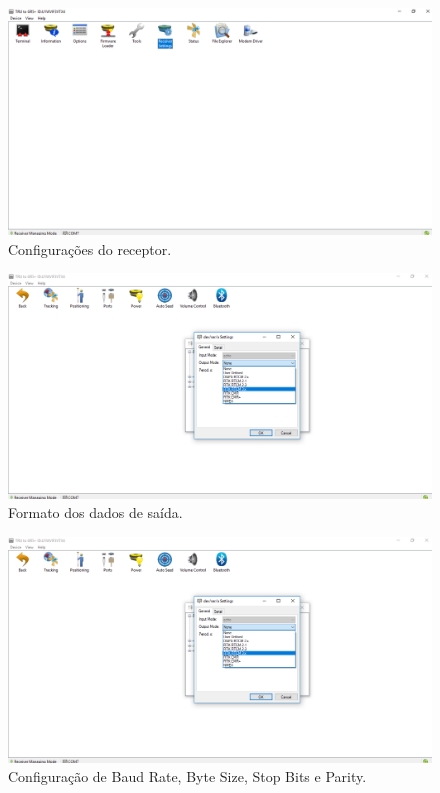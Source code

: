 \begin{figure}[H]
\centering
\includegraphics[scale=0.4]{img/6.png} %
\caption{Configurações do receptor.}
\label{Rotulo}
\end{figure}


\begin{figure}[H]
\centering
\includegraphics[scale=0.4]{img/9.png} %
\caption{Formato dos dados de saída.}
\label{Rotulo}
\end{figure}

\begin{figure}[H]
\centering
\includegraphics[scale=0.4]{img/9.png} %
\caption{Configuração de Baud Rate, Byte Size, Stop Bits e Parity.}
\label{Rotulo}
\end{figure}


